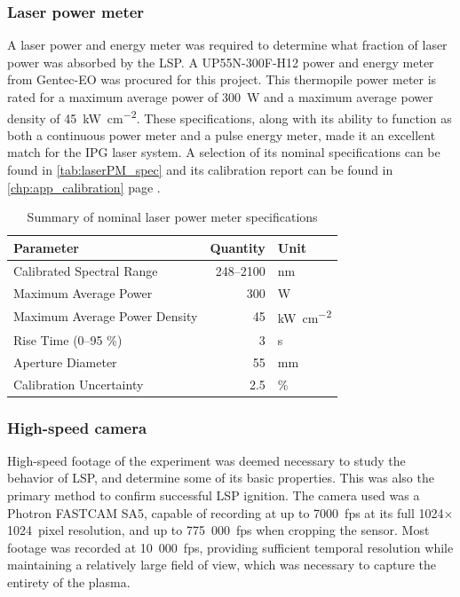             \subsubsection*{Laser power meter}
                A laser power and energy meter was required to determine what fraction of laser power was absorbed by the LSP. A UP55N-300F-H12 power and energy meter from Gentec-EO was procured for this project. This thermopile power meter is rated for a maximum average power of 300~W and a maximum average power density of \qty{45}{kW\per cm^2}. These specifications, along with its ability to function as both a continuous power meter and a pulse energy meter, made it an excellent match for the IPG laser system. A selection of its nominal specifications can be found in \autoref{tab:laserPM_spec} and its calibration report can be found in \autoref{chp:app_calibration} page \pageref*{ds:laserPM}.

                \begin{table}[h]
                    \centering
                    \caption{Summary of nominal laser power meter specifications}
                    \label{tab:laserPM_spec}
                    \begin{tabular}{@{}lrl@{}}
                        \toprule
                        Parameter            & Quantity & Unit \\ \midrule
                        Calibrated Spectral Range     & 248--2100         & nm            \\
                        Maximum Average Power         & 300               & W             \\
                        Maximum Average Power Density & 45                & \unit{kW\per cm^2}             \\
                        Rise Time (0--95 \%)          & 3                 & s            \\
                        Aperture Diameter             & 55                & mm           \\ 
                        Calibration Uncertainty       & 2.5               & \% \\
                        \bottomrule
                        \end{tabular}
                \end{table}

            \subsubsection*{High-speed camera}
                High-speed footage of the experiment was deemed necessary to study the behavior of LSP, and determine some of its basic properties. This was also the primary method to confirm successful LSP ignition. The camera used was a Photron FASTCAM SA5, capable of recording at up to 7000~fps at its full 1024$\times$1024~pixel resolution, and up to 775~000~fps when cropping the sensor. Most footage was recorded at 10~000~fps, providing sufficient temporal resolution while maintaining a relatively large field of view, which was necessary to capture the entirety of the plasma.


